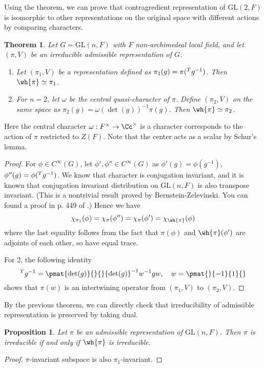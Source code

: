 \documentclass{article}
\newtheorem{theorem}{Theorem}[section]
\newcommand{\pre}[1]{\prescript{#1}{}}
\newcommand{\GL}{\mathrm{GL}}
\newtheorem{proposition}{Proposition}[section]
\begin{document}
Using the theorem, we can prove that contragredient representation of $\GL(2, F)$ is isomorphic to other representations on the original space with different actions by comparing characters. 
\begin{theorem}
\label{contra}
Let $G = \GL(n, F)$ with $F$ non-archimedeal local field, and let $(\pi, V)$ be an irreducible admissible representation of $G$. 
\begin{enumerate}
\item Let $(\pi_{1}, V)$ be a representation defined as $\pi_{1}(g) = \pi(\pre{T}{}g^{-1})$. Then $\wh{\pi}\simeq \pi_{1}$. 
\item For $n = 2$, let $\omega$ be the central quasi-character of $\pi$. Define $(\pi_{2}, V)$ on the same space as $\pi_{2}(g) = \omega(\det(g))^{-1}\pi(g)$. Then $\wh{\pi} \simeq \pi_{2}$. 
\end{enumerate}
\end{theorem}
Here the central character $\omega:F^{\times} \to \Cc^{\times}$ is a character corresponds to the action of $\pi$ restricted to $Z(F)$. Note that the center acts as a scalar by Schur's lemma. 
\begin{proof}
For $\phi\in C^{\infty}(G)$, let $\phi', \phi''\in C^{\infty}(G)$ as $\phi'(g) = \phi(g^{-1})$, $\phi''(g) = \phi(\pre{T}{}g^{-1})$. We know that character is conjugation invariant, and it is known that conjugation invariant distribution on $\GL(n, F)$ is also transpose invariant. (This is a nontrivial result proved by Bernstein-Zelevinski. You can found a proof in p. 449 of \cite{bu}.)
Hence we have
$$
\chi_{\pi_{1}}(\phi) = \chi_{\pi}(\phi'') = \chi_{\pi}(\phi') = \chi_{\wh{\pi}}(\phi)
$$
where the last equality follows from the fact that $\pi(\phi)$ and $\wh{\pi}(\phi')$ are adjoints of each other, so have equal trace. 

For 2, the following identity
$$
\pre{T}{}g^{-1} = \pmat{\det(g)}{}{}{\det(g)}^{-1} w^{-1}gw, \quad w = \pmat{}{-1}{1}{}
$$
shows that $\pi(w)$ is an intertwining operator from $(\pi_{1}, V)$ to $(\pi_{2}, V)$. 
\end{proof}

By the previous theorem, we can directly check that irreducibility of admissible representation is preserved by taking dual. 
\begin{proposition}
Let $\pi$ be an admissible representation of $\GL(n, F)$. Then $\pi$ is irreducible if and only if $\wh{\pi}$ is irreducible. 
\end{proposition}
\begin{proof}
$\pi$-invariant subspace is also $\pi_{1}$-invariant. 
\end{proof}
\end{document}
